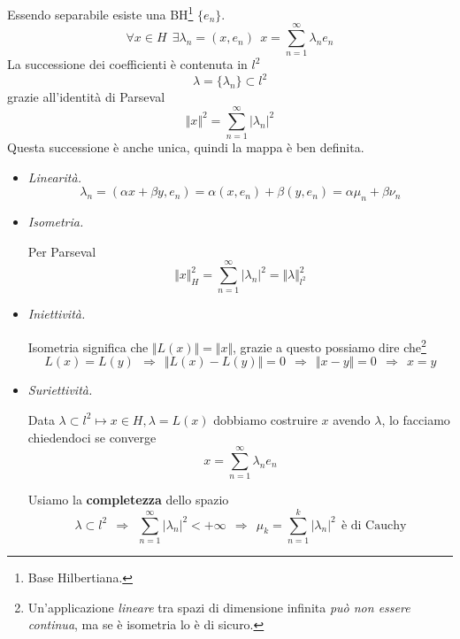 \documentclass[10pt,a4paper,twoside]{book}
\begin{document}
Essendo separabile esiste una BH\footnote{Base Hilbertiana.} $\{e_{n}\}$.
\begin{equation*}
\forall x\in H\ \ \exists \lambda _{n} =( x,e_{n}) \ \ x=\sum ^{\infty }_{n=1} \lambda _{n} e_{n}
\end{equation*}
La successione dei coefficienti è contenuta in $l^{2}$
\begin{equation*}
\lambda =\{\lambda _{n}\} \subset l^{2}
\end{equation*}
grazie all'identità di Parseval
\begin{equation*}
\Vert x\Vert ^{2} =\sum\limits ^{\infty }_{n=1}| \lambda _{n}| ^{2}
\end{equation*}
Questa successione è anche unica, quindi la mappa è ben definita.
\begin{itemize}
\item \textit{Linearità.}\begin{equation*}
\lambda _{n} =( \alpha x+\beta y,e_{n}) =\alpha ( x,e_{n}) +\beta ( y,e_{n}) =\alpha \mu _{n} +\beta \nu _{n}
\end{equation*}
\item \textit{Isometria.}

Per Parseval\begin{equation*}
\Vert x\Vert ^{2}_{H} =\sum ^{\infty }_{n=1}| \lambda _{n}| ^{2} =\Vert \lambda \Vert ^{2}_{l^{2}}
\end{equation*}
\item \textit{Iniettività.}

Isometria significa che $\Vert L( x)\Vert =\Vert x\Vert $, grazie a questo possiamo dire che\footnote{Un'applicazione \textit{lineare} tra spazi di dimensione infinita \textit{può non essere continua}, ma se è isometria lo è di sicuro.}\begin{equation*}
L( x) =L( y) \ \ \Rightarrow \ \ \Vert L( x) -L( y)\Vert =0\ \ \Rightarrow \ \ \Vert x-y\Vert =0\ \ \Rightarrow \ \ x=y
\end{equation*}
\item \textit{Suriettività.}

Data $\lambda \subset l^{2} \mapsto x\in H,\lambda =L( x)$ dobbiamo costruire $x$ avendo $\lambda $, lo facciamo chiedendoci se converge\begin{equation*}
x=\sum ^{\infty }_{n=1} \lambda _{n} e_{n}
\end{equation*}

Usiamo la \textbf{completezza} dello spazio\begin{equation*}
\lambda \subset l^{2} \ \ \Rightarrow \ \ \sum\limits ^{\infty }_{n=1}| \lambda _{n}| ^{2} < +\infty \ \ \Rightarrow \ \ \mu _{k} =\sum\limits ^{k}_{n=1}| \lambda _{n}| ^{2} \ \ \text{è di Cauchy}
\end{equation*}


\end{itemize}
\end{document}
